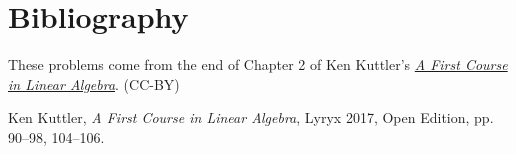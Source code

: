 \documentclass{ximera}
\begin{document}
\section*{Bibliography}
These problems come from the end of Chapter 2 of Ken Kuttler's \href{https://open.umn.edu/opentextbooks/textbooks/a-first-course-in-linear-algebra-2017}{\it A First Course in Linear Algebra}. (CC-BY)

Ken Kuttler, {\it  A First Course in Linear Algebra}, Lyryx 2017, Open Edition, pp. 90--98, 104--106. 
\end{document}
